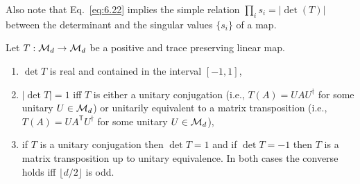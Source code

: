 \documentclass[11pt,a4paper]{article}
\theoremstyle{plain}
\theoremstyle{definition}
\theoremstyle{remark}
\begin{document}
Also note that Eq.~\eqref{eq:6.22} implies the simple relation $\prod_i s_i=|\det(T)|$
between the determinant and the singular values $\{s_i\}$ of a map.

\begin{theorem}[Determinants]
    Let $T:\mathcal{M}_d\to\mathcal{M}_d$ be a positive and trace preserving linear map.
    \begin{enumerate}
        \item $\det T$ is real and contained in the interval $[-1,1]$,
        \item $|\det T|=1$ iff $T$ is either a unitary conjugation (i.e., $T(A)=UAU^\dagger$
              for some unitary $U\in\mathcal{M}_d$) or unitarily equivalent to a matrix transposition
              (i.e., $T(A)=UA^{\mathsf T}U^\dagger$ for some unitary $U\in\mathcal{M}_d$),
        \item if $T$ is a unitary conjugation then $\det T=1$ and if $\det T=-1$ then $T$
              is a matrix transposition up to unitary equivalence. In both cases the converse
              holds iff $\lfloor d/2\rfloor$ is odd.
    \end{enumerate}
\end{theorem}
\end{document}
